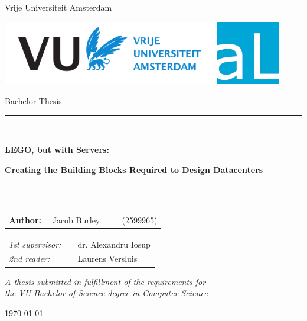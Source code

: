 \documentclass[11pt]{article}
\begin{document}
\thispagestyle{empty}
\newcommand{\opendc}{OpenDC}

\begin{center}

Vrije Universiteit Amsterdam

\vspace{1mm}

\includegraphics[height=28mm]{vu-griffioen-white.pdf}
\includegraphics[height=28mm]{atLarge.jpg}

\vspace{1.5cm}

{\Large Bachelor Thesis}

\vspace*{1.5cm}

\rule{.9\linewidth}{.6pt}\\[0.4cm]
{\huge \bfseries LEGO, but with Servers:\par}
{\Large \bfseries Creating the Building Blocks Required to Design Datacenters\par}\vspace{0.4cm}
\rule{.9\linewidth}{.6pt}\\[1.5cm]

\vspace*{2mm}

{\Large
\begin{tabular}{l}
{\bf Author:} ~~Jacob Burley ~~~~ (2599965)
\end{tabular}
}

\vspace*{1.5cm}

\begin{tabular}{ll}
{\it 1st supervisor:}   & ~~dr. Alexandru Iosup \\
{\it 2nd reader:}       & ~~Laurens Versluis
\end{tabular}

\vspace*{2cm}

\textit{A thesis submitted in fulfillment of the requirements for\\ the VU Bachelor of Science degree in Computer Science}

\vspace*{1cm}

\today\\[4cm] %

\end{center}
\end{document}
